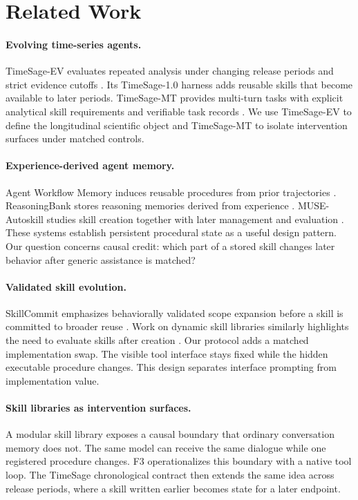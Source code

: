 \section{Related Work}
\paragraph{Evolving time-series agents.} TimeSage-EV evaluates repeated analysis under changing release periods and strict evidence cutoffs \citep{yao2026timesage}. Its TimeSage-1.0 harness adds reusable skills that become available to later periods. TimeSage-MT provides multi-turn tasks with explicit analytical skill requirements and verifiable task records \citep{kong2026timesagemt}. We use TimeSage-EV to define the longitudinal scientific object and TimeSage-MT to isolate intervention surfaces under matched controls.

\paragraph{Experience-derived agent memory.} Agent Workflow Memory induces reusable procedures from prior trajectories \citep{wang2024awm}. ReasoningBank stores reasoning memories derived from experience \citep{ouyang2026reasoningbank}. MUSE-Autoskill studies skill creation together with later management and evaluation \citep{lin2026muse}. These systems establish persistent procedural state as a useful design pattern. Our question concerns causal credit: which part of a stored skill changes later behavior after generic assistance is matched?

\paragraph{Validated skill evolution.} SkillCommit emphasizes behaviorally validated scope expansion before a skill is committed to broader reuse \citep{he2026skillcommit}. Work on dynamic skill libraries similarly highlights the need to evaluate skills after creation \citep{li2026dynamicskills}. Our protocol adds a matched implementation swap. The visible tool interface stays fixed while the hidden executable procedure changes. This design separates interface prompting from implementation value.

\paragraph{Skill libraries as intervention surfaces.} A modular skill library exposes a causal boundary that ordinary conversation memory does not. The same model can receive the same dialogue while one registered procedure changes. F3 operationalizes this boundary with a native tool loop. The TimeSage chronological contract then extends the same idea across release periods, where a skill written earlier becomes state for a later endpoint.
